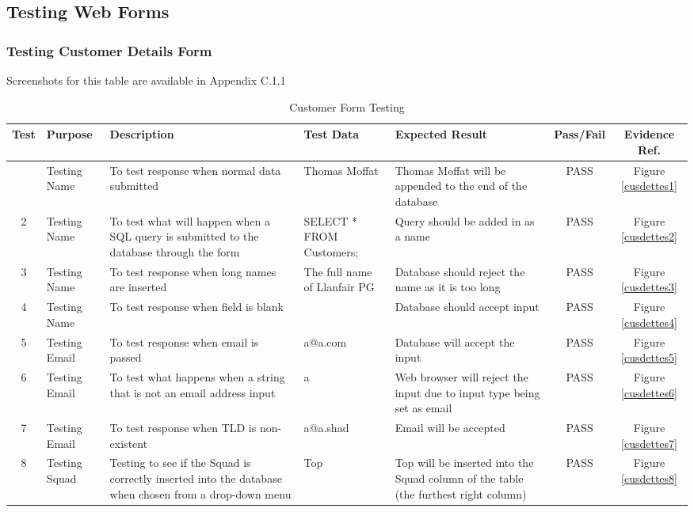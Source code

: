 \documentclass[
11pt, %
a4paper, %
oneside, %
headinclude,footinclude, %
BCOR5mm, %
]{scrartcl}
\begin{document}
\subsection{Testing Web Forms}
	
	\subsubsection{Testing Customer Details Form}
	Screenshots for this table are available in Appendix C.1.1
		
		\begin{longtable}[l]{|c|p{2.5cm}|p{3cm}|p{3cm}|p{3cm}|c|c|}
		\caption{Customer Form Testing}\\
		\hline
			Test & Purpose & Description & Test Data & Expected Result & Pass/Fail & Evidence Ref. \\ [0.5ex]
			\hline
			\endhead
			\hline
			\endfoot
			1 & Testing Name & To test response when normal data submitted & Thomas Moffat & Thomas Moffat will be appended to the end of the database & PASS & Figure \ref{cusdettes1}\\
			2 & Testing Name & To test what will happen when a SQL query is submitted to the database through the form & SELECT * FROM Customers; & Query should be added in as a name & PASS & Figure \ref{cusdettes2} \\
			3 & Testing Name & To test response when long names are inserted & The full name of Llanfair PG & Database should reject the name as it is too long & PASS & Figure \ref{cusdettes3}\\
			4 & Testing Name & To test response when field is blank & & Database should accept input & PASS & Figure \ref{cusdettes4} \\
			5 & Testing Email & To test response when email is passed & a@a.com & Database will accept the input & PASS & Figure \ref{cusdettes5}\\
			6 & Testing Email & To test what happens when a string that is not an email address input & a & Web browser will reject the input due to input type being set as email & PASS & Figure \ref{cusdettes6}\\
			7 & Testing Email & To test response when TLD is non-existent & a@a.shad & Email will be accepted & PASS & Figure \ref{cusdettes7}\\
			8 & Testing Squad & Testing to see if the Squad is correctly inserted into the database when chosen from a drop-down menu & Top & Top will be inserted into the Squad column of the table (the furthest right column) & PASS & Figure \ref{cusdettes8} \\

\end{longtable}
\end{document}
